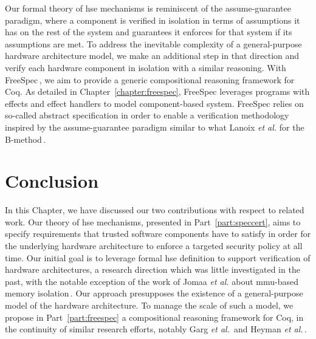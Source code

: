 Our formal theory of \ac{hse} mechanisms is reminiscent of the assume-guarantee
paradigm, where a component is verified in isolation in terms of assumptions it
has on the rest of the system and guarantees it enforces for that system if its
assumptions are met.
%
To address the inevitable complexity of a general-purpose hardware architecture
model, we make an additional step in that direction and verify each hardware
component in isolation with a similar reasoning.
%
With FreeSpec\,\cite{letan2018freespeccode}, we aim to provide a generic
compositional reasoning framework for Coq.
%
As detailed in Chapter~\ref{chapter:freespec}, FreeSpec leverages programs with
effects and effect handlers to model component-based system.
%
FreeSpec relies on so-called abstract specification in order to enable a
verification methodology inspired by the assume-guarantee paradigm similar to
what Lanoix \emph{et al.} for the B-method\,\cite{lanoix:hal-00105041}.

\section{Conclusion}
\label{sec:sota:conclusion}

In this Chapter, we have discussed our two contributions with respect to related
work.
%
Our theory of \ac{hse} mechanisms, presented in Part~\ref{part:speccert}, aims
to specify requirements that trusted software components have to satisfy in
order for the underlying hardware architecture to enforce a targeted security
policy at all time.
%
Our initial goal is to leverage formal \ac{hse} definition to support
verification of hardware architectures, a research direction which was little
investigated in the past, with the notable exception of the work of Jomaa
\emph{et al.} about \ac{mmu}-based memory isolation\,\cite{jomaa2016mmu}.
%
Our approach presupposes the existence of a general-purpose model of the
hardware architecture.
%
To manage the scale of such a model, we propose in Part~\ref{part:freespec} a
compositional reasoning framework for Coq, in the continuity of similar research
efforts, notably Garg \emph{et al.}\,\cite{garg2010compositional} and Heyman
\emph{et al.}\,\cite{heyman2012securemodel}.